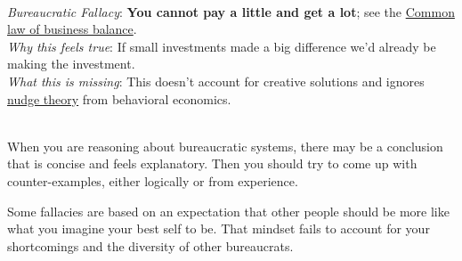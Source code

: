 \ \\
\begin{samepage}
\textit{Bureaucratic Fallacy}: 
\textbf{You cannot pay a little and get a lot}; see the \href{https://en.wikipedia.org/wiki/Common_law_of_business_balance}{Common law of business balance}. 
 \\
\textit{Why this feels true}: If small investments made a big difference we'd already be making the investment.\\
\textit{What this is missing}: This doesn't account for creative solutions and ignores \href{https://en.wikipedia.org/wiki/Nudge_theory}{nudge theory}
from behavioral economics. 
\end{samepage}

\ \\

When you are reasoning about bureaucratic systems, there may be a conclusion that is concise and feels explanatory. Then you should try to come up with counter-examples, either logically or from experience.  

Some fallacies are based on an expectation that other people should be more like what you imagine your best self to be. That mindset fails to account for your  shortcomings and the diversity of other bureaucrats. 

